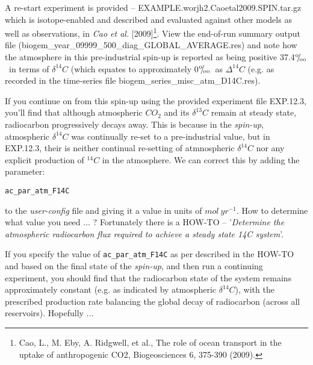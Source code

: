 \documentclass[11pt,fleqn]{book} %
\def\permille{\ensuremath{{}^\text{o}\mkern-5mu/\mkern-3mu_\text{oo}}}
\begin{document}
A re-start experiment is provided -- \textsf{\footnotesize EXAMPLE.worjh2.Caoetal2009.SPIN.tar.gz} which is isotope-enabled and described and evaluated against other models as well as observations, in \textit{Cao et al.} [2009]\footnote{Cao, L., M. Eby, A. Ridgwell, et al., The role of ocean transport in the uptake of anthropogenic CO2, Biogeosciences 6, 375-390 (2009).}. View the end-of-run summary output file (\textsf{\footnotesize biogem\_year\_09999\_500\_diag\_GLOBAL\_AVERAGE.res}) and note how the atmosphere in this pre-industrial spin-up is reported as being positive 37.4\permille \ in terms of \(\delta^{14}C\) (which equates to approximately \(0\)\permille \ as \(\Delta^{14}C\) (e.g. as recorded in the time-series file \textsf{\footnotesize biogem\_series\_misc\_atm\_D14C.res}).

If you continue on from this spin-up using the provided experiment file \textsf{\footnotesize EXP.12.3}, you'll find that although atmospheric \(CO_{2}\) and its \(\delta^{13}C\) remain at steady state, radiocarbon progressively decays away. This is because in the \textit{spin-up}, atmospheric \(\delta^{14}C\) was continually re-set to a pre-industrial value, but in \textsf{\footnotesize EXP.12.3}, their is neither continual re-setting of atmnospheric \(\delta^{14}C\) nor any explicit production of \(^{14}C\) in the atmosphere. We can correct this by adding the parameter:
\vspace{-1mm}\begin{verbatim}
ac_par_atm_F14C
\end{verbatim}\vspace{-1mm}
to the \textit{user-config} file and giving it a value in units of \(mol \ yr^{-1}\). How to determine what value you need ... ?
Fortunately there is a HOW-TO -- '\textit{Determine the atmospheric radiocarbon flux required to achieve a steady state 14C system}'.

If you specify the value of \texttt{ac\_par\_atm\_F14C} as per described in the HOW-TO and based on the final state of the \textit{spin-up}, and then run a continuing experiment, you should find that the radiocarbon state of the system remains approximately constant (e.g. as indicated by atmospheric \(\delta^{14}C\)), with the prescribed production rate balancing the global decay of radiocarbon (across all reservoirs). Hopefully ...



\newpage

\end{document}
